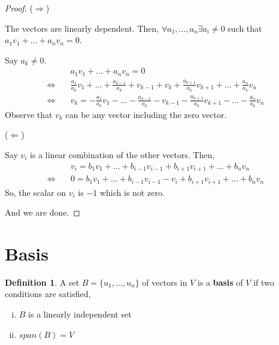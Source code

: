 \documentclass{report}
\theoremstyle{definition}
\newtheorem{_def}{Definition}
\begin{document}
\begin{proof}
($\Rightarrow$)

The vectors are linearly dependent.
Then, $\forall a_1,...,a_n \exists a_i\neq 0$ such that $a_1v_1+...+a_nv_n=0$.

Say $a_k\neq 0$.
\begin{align*}
& a_1v_1+...+a_nv_n=0 \\
\Leftrightarrow \quad &\frac{a_1}{a_k}v_1+...+\frac{a_{k-1}}{a_k}+v_{k-1}+v_k+\frac{a_{k+1}}{a_k}v_{k+1}+...+\frac{a_n}{a_k}v_n \\
\Leftrightarrow \quad &v_k=-\frac{a_1}{a_k}v_1-...-\frac{a_{k-1}}{a_k}-v_{k-1}-\frac{a_{k+1}}{a_k}v_{k+1}-...-\frac{a_n}{a_k}v_n
\end{align*}
Observe that $v_k$ can be any vector including the zero vector.

($\Leftarrow$)

Say $v_i$ is a linear combination of the other vectors.
Then,
\begin{align*}
& v_i=b_1v_1+...+b_{i-1}v_{i-1}+b_{i+1}v_{i+1}+...+b_nv_n \\
\Leftrightarrow \quad & 0=b_1v_1+...+b_{i-1}v_{i-1}-v_i+b_{i+1}v_{i+1}+...+b_nv_n
\end{align*}
So, the scalar on $v_i$ is $-1$ which is not zero.

And we are done.
\end{proof}

\section{Basis}

\begin{_def}
A set $B=\{u_1,...,u_n\}$ of vectors in $V$ is a \textbf{basis} of $V$ if two conditions are satisfied,
\begin{enumerate}[i)]
 \item $B$ is a linearly independent set
 \item $span(B)=V$
\end{enumerate}
\end{_def}
\end{document}
